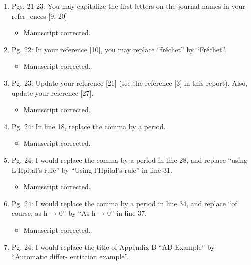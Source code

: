 \documentclass{article}
\begin{document}
\begin{enumerate}
 \item Pgs. 21-23: You may capitalize the ﬁrst letters on the journal names in your refer-
ences [9, 20]

{\color{red}  
\begin{itemize}
     \item
 Manuscript corrected.
  \end{itemize}}

 \item Pg. 22: In your reference [10], you may replace “fr{\'e}chet” by “Fr{\'e}chet”.

{\color{red}  
\begin{itemize}
     \item
 Manuscript corrected.
  \end{itemize}}

 \item Pg. 23: Update your reference [21] (see the reference [3] in this report). Also,
update your reference [27].

{\color{red}  
\begin{itemize}
     \item
 Manuscript corrected.
  \end{itemize}}

 \item Pg. 24: In line 18, replace the comma by a period.

{\color{red}  
\begin{itemize}
     \item
 Manuscript corrected.
  \end{itemize}}

 \item Pg. 24: I would replace the comma by a period in line 28, and replace “using
     L’H{}pital’s rule” by “Using l’H{}pital’s rule” in line 31.

{\color{red}  
\begin{itemize}
     \item
 Manuscript corrected.
  \end{itemize}}

 \item Pg. 24: I would replace the comma by a period in line 34, and replace “of course,
as h → 0” by “As h → 0” in line 37.

{\color{red}  
\begin{itemize}
     \item
 Manuscript corrected.
  \end{itemize}}

 \item Pg. 24: I would replace the title of Appendix B “AD Example” by “Automatic differ-
entiation example”.


\end{enumerate}
\end{document}
